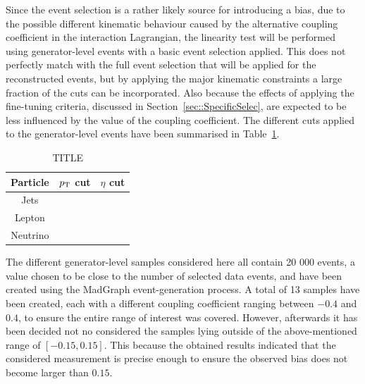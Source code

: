 Since the event selection is a rather likely source for introducing a bias, due to the possible different kinematic behaviour caused by the alternative coupling coefficient in the interaction Lagrangian, the linearity test will be performed using generator-level events with a basic event selection applied.
This does not perfectly match with the full event selection that will be applied for the reconstructed events, but by applying the major kinematic constraints a large fraction of the cuts can be incorporated. Also because the effects of applying the fine-tuning criteria, discussed in Section~\ref{sec::SpecificSelec}, are expected to be less influenced by the value of the coupling coefficient. The different cuts applied to the generator-level events have been summarised in Table~\ref{table::GenCuts}.

\begin{table}[h!t]
 \centering
 \caption{TITLE} \label{table::GenCuts}
 \begin{tabular}{c|c|c}
  Particle 	& $p_{\rm T}$ cut 	& $\eta$ cut 	\\
  \hline
  Jets 		&		&		\\
  Lepton	&		&		\\
  Neutrino 	&		&		
 \end{tabular}
\end{table}

The different generator-level samples considered here all contain 20 000 events, a value chosen to be close to the number of selected data events, and have been created using the MadGraph event-generation process. A total of 13 samples have been created, each with a different coupling coefficient ranging between $-0.4$ and $0.4$, to ensure the entire range of interest was covered. 
However, afterwards it has been decided not no considered the samples lying outside of the above-mentioned range of $\left[-0.15, 0.15\right]$. This because the obtained results indicated that the considered measurement is precise enough to ensure the observed bias does not become larger than $0.15$.
\\

